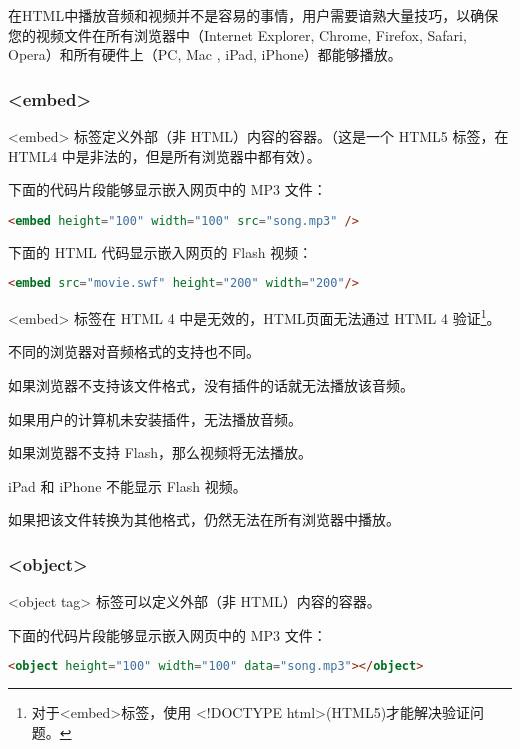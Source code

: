 在HTML中播放音频和视频并不是容易的事情，用户需要谙熟大量技巧，以确保您的视频文件在所有浏览器中（Internet Explorer, Chrome, Firefox, Safari, Opera）和所有硬件上（PC, Mac , iPad, iPhone）都能够播放。

\subsubsection{<embed>}

<embed> 标签定义外部（非 HTML）内容的容器。（这是一个 HTML5 标签，在 HTML4 中是非法的，但是所有浏览器中都有效）。

下面的代码片段能够显示嵌入网页中的 MP3 文件：

\begin{lstlisting}[language=HTML]
	<embed height="100" width="100" src="song.mp3" />
\end{lstlisting}

下面的 HTML 代码显示嵌入网页的 Flash 视频：

\begin{lstlisting}[language=HTML]
	<embed src="movie.swf" height="200" width="200"/>
\end{lstlisting}

\begin{compactitem}
\item <embed> 标签在 HTML 4 中是无效的，HTML页面无法通过 HTML 4 验证\footnote{对于<embed>标签，使用 <!DOCTYPE html>(HTML5)才能解决验证问题。}。
\item 不同的浏览器对音频格式的支持也不同。
\item 如果浏览器不支持该文件格式，没有插件的话就无法播放该音频。
\item 如果用户的计算机未安装插件，无法播放音频。
\item 如果浏览器不支持 Flash，那么视频将无法播放。
\item iPad 和 iPhone 不能显示 Flash 视频。
\item 如果把该文件转换为其他格式，仍然无法在所有浏览器中播放。
\end{compactitem}

\subsubsection{<object>}

<object tag> 标签可以定义外部（非 HTML）内容的容器。

下面的代码片段能够显示嵌入网页中的 MP3 文件：

\begin{lstlisting}[language=HTML]
	<object height="100" width="100" data="song.mp3"></object>
\end{lstlisting}

